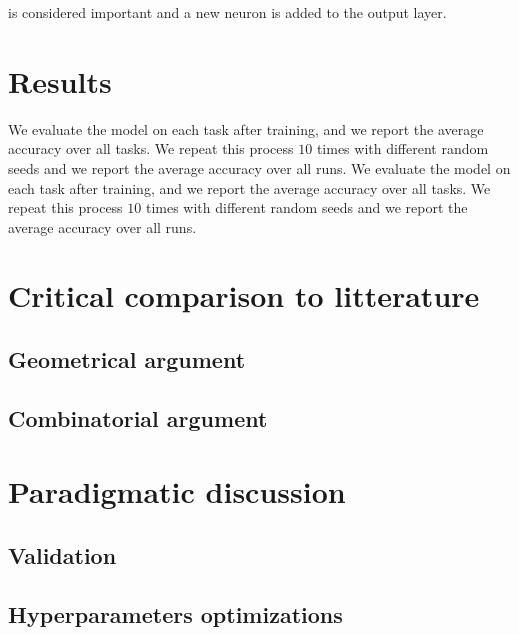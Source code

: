\documentclass[twocolumn]{article}
\begin{document}
is considered important and a new neuron is added to the output layer. 




\section{Results}
We evaluate the model on each task after training, and we report the average accuracy over all tasks. We repeat this process $10$ times with different random seeds and we report the average accuracy over all runs.
We evaluate the model on each task after training, and we report the average accuracy over all tasks. We repeat this process $10$ times with different random seeds and we report the average accuracy over all runs.


\section{Critical comparison to litterature}


\subsection{Geometrical argument}


\subsection{Combinatorial argument}



\section{Paradigmatic discussion}



\subsection{Validation}


\subsection{Hyperparameters optimizations}
\end{document}
